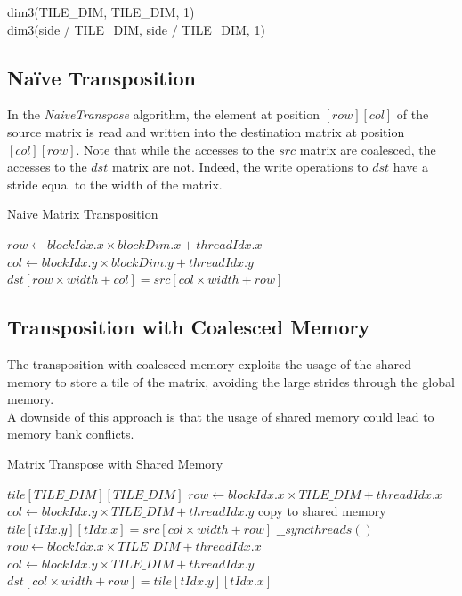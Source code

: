 \documentclass{IEEEconf}
\begin{document}
dim3(TILE\_DIM, TILE\_DIM, 1) \\

dim3(side / TILE\_DIM, side / TILE\_DIM, 1)
\subsection{Na\"{i}ve Transposition}
In the \textit{NaiveTranspose} algorithm, the element at position $[row][col]$ of the source matrix is read and written into the destination matrix at position $[col][row]$.
Note that while the accesses to the $src$ matrix are coalesced, the accesses to the $dst$ matrix are not.
Indeed, the write operations to $dst$ have a stride equal to the width of the matrix.
\begin{algorithm}
    \caption{Naive Matrix Transposition}
    \begin{algorithmic}[1]
            \State $row \gets blockIdx.x \times blockDim.x + threadIdx.x$
            \State $col \gets blockIdx.y \times blockDim.y + threadIdx.y$
                \State $dst[row \times width + col] = src[col \times width + row]$
            \EndIf
        \EndProcedure
    \end{algorithmic}
\end{algorithm}
\subsection{Transposition with Coalesced Memory}
The transposition with coalesced memory exploits the usage of the shared memory to store a tile of the matrix,
avoiding the large strides through the global memory. \\
A downside of this approach is that the usage of shared memory could lead to memory bank conflicts.
\begin{algorithm}
    \caption{Matrix Transpose with Shared Memory}
    \begin{algorithmic}[1]
            \State $tile [TILE\_DIM][TILE\_DIM]$
            \State $row \gets blockIdx.x \times TILE\_DIM + threadIdx.x$
            \State $col \gets blockIdx.y \times TILE\_DIM + threadIdx.y$
             \Comment copy to shared memory
                \State $tile[tIdx.y][tIdx.x] = src[col \times width + row]$
            \EndIf
            \State $\_\_syncthreads()$
            \State $row \gets blockIdx.x \times TILE\_DIM + threadIdx.x$
            \State $col \gets blockIdx.y \times TILE\_DIM + threadIdx.y$
                \State $dst[col \times width + row] = tile[tIdx.y][tIdx.x]$
            \EndIf
        \EndProcedure
    \end{algorithmic}
\end{algorithm}
\end{document}
